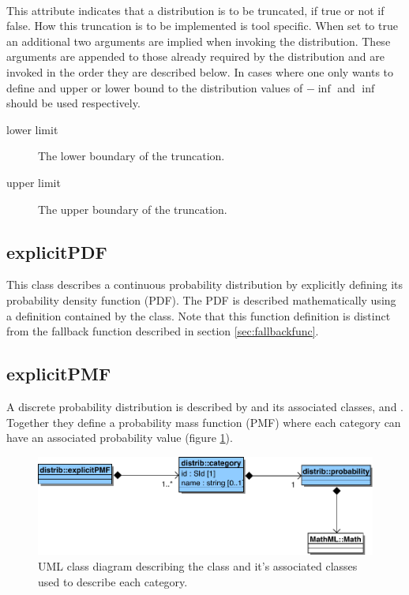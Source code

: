 \documentclass[draftspec]{sbmlpkgspec}
\begin{document}
\paragraph{}
\label{sec:truncatt}

This attribute indicates that a distribution is to be truncated, if
true or not if false. How this truncation is to be implemented is tool
specific. When set to true an additional two arguments are implied
when invoking the distribution. These arguments are appended to
those already required by the distribution and are invoked in the
order they are described below. In cases where one only wants to
define and upper or lower bound to the distribution values of
$-\inf$ and $\inf$ should be used respectively.

\begin{description}
\item[lower limit] The lower boundary of the truncation.
\item[upper limit] The upper boundary of the truncation.
\end{description}

\subsection{explicitPDF}

This class describes a continuous probability distribution by explicitly
defining its probability density function (PDF). The PDF is described
mathematically using a \mathml definition contained by the
 class. Note that this function definition is
distinct from the fallback function described in section \ref{sec:fallbackfunc}.

\subsection{explicitPMF}

A discrete probability distribution is described by
 and its associated classes,  and
. Together they define a probability mass function
(PMF) where each category can have an associated probability value
(figure \ref{fig:explicitpmf}).

\begin{figure}[htb]
\includegraphics[width=0.75\linewidth]{explicitPMFUML.pdf}
\caption{UML class diagram describing the 
  class and it's associated classes used to describe each category.}
\label{fig:explicitpmf}
\end{figure}
\end{document}
